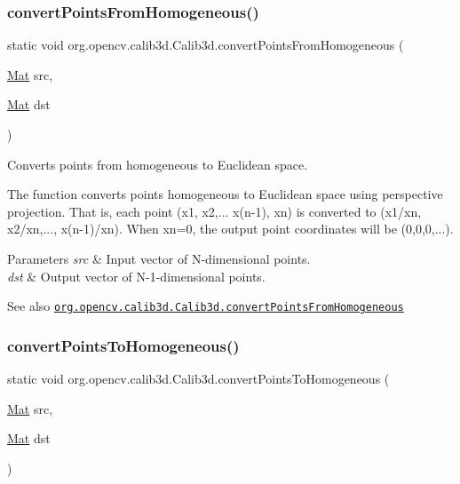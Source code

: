 \subsubsection{\texorpdfstring{convert\+Points\+From\+Homogeneous()}{convertPointsFromHomogeneous()}}
{\footnotesize\ttfamily static void org.\+opencv.\+calib3d.\+Calib3d.\+convert\+Points\+From\+Homogeneous (\begin{DoxyParamCaption}\item[{\mbox{\hyperlink{classorg_1_1opencv_1_1core_1_1_mat}{Mat}}}]{src,  }\item[{\mbox{\hyperlink{classorg_1_1opencv_1_1core_1_1_mat}{Mat}}}]{dst }\end{DoxyParamCaption})\hspace{0.3cm}{\ttfamily [static]}}

Converts points from homogeneous to Euclidean space.

The function converts points homogeneous to Euclidean space using perspective projection. That is, each point {\ttfamily (x1, x2,... x(n-\/1), xn)} is converted to {\ttfamily (x1/xn, x2/xn,..., x(n-\/1)/xn)}. When {\ttfamily xn=0}, the output point coordinates will be {\ttfamily (0,0,0,...)}.


\begin{DoxyParams}{Parameters}
{\em src} & Input vector of {\ttfamily N}-\/dimensional points. \\
\hline
{\em dst} & Output vector of {\ttfamily N-\/1}-\/dimensional points.\\
\hline
\end{DoxyParams}
\begin{DoxySeeAlso}{See also}
\href{http://docs.opencv.org/modules/calib3d/doc/camera_calibration_and_3d_reconstruction.html#convertpointsfromhomogeneous}{\tt org.\+opencv.\+calib3d.\+Calib3d.\+convert\+Points\+From\+Homogeneous} 
\end{DoxySeeAlso}
\mbox{\label{classorg_1_1opencv_1_1calib3d_1_1_calib3d_a718a2c8745024b449e6d2435937cae4f}} 
\subsubsection{\texorpdfstring{convert\+Points\+To\+Homogeneous()}{convertPointsToHomogeneous()}}
{\footnotesize\ttfamily static void org.\+opencv.\+calib3d.\+Calib3d.\+convert\+Points\+To\+Homogeneous (\begin{DoxyParamCaption}\item[{\mbox{\hyperlink{classorg_1_1opencv_1_1core_1_1_mat}{Mat}}}]{src,  }\item[{\mbox{\hyperlink{classorg_1_1opencv_1_1core_1_1_mat}{Mat}}}]{dst }\end{DoxyParamCaption})\hspace{0.3cm}{\ttfamily [static]}}

